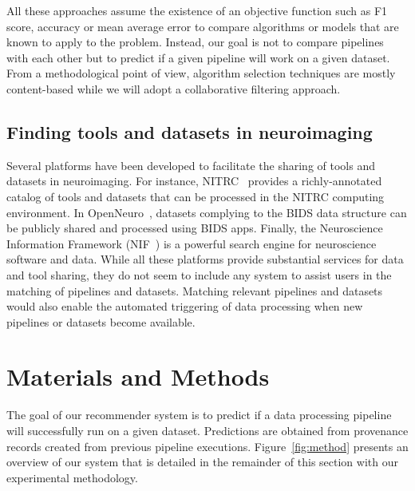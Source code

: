 \documentclass[conference]{IEEEtran}
\begin{document}
All these approaches assume the existence of an objective function such as F1 score, accuracy or mean average error to compare algorithms or models that are known to apply to the problem. Instead, our goal is not to compare pipelines with each other but to predict if a given pipeline will work on a given dataset. From a methodological point of view, algorithm selection techniques are mostly content-based  while we will adopt a collaborative filtering approach.

\subsection{Finding tools and datasets in neuroimaging}

Several platforms have been developed to facilitate the sharing of tools and datasets 
in neuroimaging. For instance, NITRC~\cite{kennedy2016nitrc} provides a richly-annotated catalog of tools and datasets that can be processed in the NITRC computing environment. In OpenNeuro~\cite{markiewicz2021openneuro}, datasets complying to the BIDS data structure can be publicly shared and processed using BIDS apps.  Finally, the Neuroscience Information Framework (NIF~\cite{gardner2008neuroscience}) is a powerful search engine for neuroscience software and data. While all these platforms provide substantial services for data and tool sharing, they do not seem to include any system to assist users in the matching of pipelines and datasets. Matching relevant pipelines and datasets would also enable the automated triggering of data processing when new pipelines or datasets become available. 

\section{Materials and Methods}

The goal of our recommender system is to predict if a data processing
pipeline will successfully run on a given dataset. Predictions are obtained
from provenance records created from previous pipeline executions.
Figure~\ref{fig:method} presents an overview of our system that is detailed
in the remainder of this section with our experimental methodology.

%   
\end{document}
